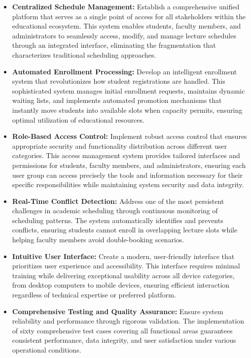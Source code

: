 \begin{itemize}[leftmargin=*]
    \item \textbf{Centralized Schedule Management:} Establish a comprehensive unified platform that serves as a single point of access for all stakeholders within the educational ecosystem. This system enables students, faculty members, and administrators to seamlessly access, modify, and manage lecture schedules through an integrated interface, eliminating the fragmentation that characterizes traditional scheduling approaches.
    
    \item \textbf{Automated Enrollment Processing:} Develop an intelligent enrollment system that revolutionizes how student registrations are handled. This sophisticated system manages initial enrollment requests, maintains dynamic waiting lists, and implements automated promotion mechanisms that instantly move students into available slots when capacity permits, ensuring optimal utilization of educational resources.
    
    \item \textbf{Role-Based Access Control:} Implement robust access control that ensures appropriate security and functionality distribution across different user categories. This access management system provides tailored interfaces and permissions for students, faculty members, and administrators, ensuring each user group can access precisely the tools and information necessary for their specific responsibilities while maintaining system security and data integrity.
    
    \item \textbf{Real-Time Conflict Detection:} Address one of the most persistent challenges in academic scheduling through continuous monitoring of scheduling patterns. The system automatically identifies and prevents conflicts, ensuring students cannot enroll in overlapping lecture slots while helping faculty members avoid double-booking scenarios.
    
    \item \textbf{Intuitive User Interface:} Create a modern, user-friendly interface that prioritizes user experience and accessibility. This interface requires minimal training while delivering exceptional usability across all device categories, from desktop computers to mobile devices, ensuring efficient interaction regardless of technical expertise or preferred platform.
    
    \item \textbf{Comprehensive Testing and Quality Assurance:} Ensure system reliability and performance through rigorous validation. The implementation of sixty comprehensive test cases covering all functional areas guarantees consistent performance, data integrity, and user satisfaction under various operational conditions.
    

\end{itemize}
